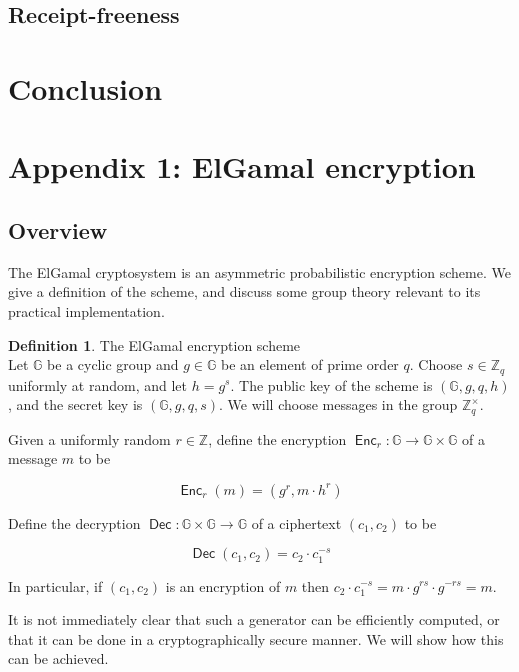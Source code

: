 \documentclass[11pt,twoside,a4paper]{article}
\DeclareMathOperator{\Enc}{\mathsf{Enc}}
\DeclareMathOperator{\Dec}{\mathsf{Dec}}
\theoremstyle{definition}
\newtheorem{definition}{Definition}[section]
\begin{document}
\subsection{Receipt-freeness}
\section{Conclusion}
\vfill\pagebreak
\section{Appendix 1: ElGamal encryption}\label{app-elgamal}
\subsection{Overview}
The ElGamal cryptosystem is an asymmetric probabilistic encryption scheme. We give a definition of the scheme, and discuss some group theory relevant to its practical implementation.
\begin{definition}{The ElGamal encryption scheme}\\
    Let \(\mathbb{G}\) be a cyclic group and \(g\in\mathbb{G}\) be an element of prime order \(q\). Choose \(s\in\mathbb{Z}_q\) uniformly at random, and let \(h=g^s\). The public key of the scheme is \((\mathbb{G}, g, q, h)\), and the secret key is \((\mathbb{G}, g, q, s)\). We will choose messages in the group \(\mathbb{Z}^\times_q\).

    Given a uniformly random \(r\in\mathbb{Z}\), define the encryption \(\Enc_r:\mathbb{G}\rightarrow\mathbb{G}\times\mathbb{G}\) of a message \(m\) to be
    
    \[\Enc_r(m) = (g^r, m\cdot h^r)\]

    Define the decryption \(\Dec:\mathbb{G}\times\mathbb{G}\rightarrow \mathbb{G}\) of a ciphertext \((c_1, c_2)\) to be
    
    \[\Dec(c_1,c_2)=c_2\cdot c_1^{-s}\]

    In particular, if \((c_1,c_2)\) is an encryption of \(m\) then \(c_2\cdot c_1^{-s}=m\cdot g^{rs}\cdot g^{-rs}=m\).
\end{definition}
It is not immediately clear that such a generator can be efficiently computed, or that it can be done in a cryptographically secure manner. We will show how this can be achieved.
\end{document}
